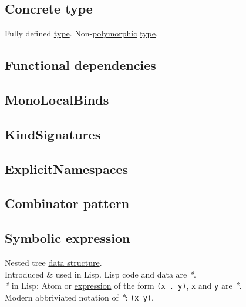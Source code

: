 \documentclass[11pt]{article}
\begin{document}
\subsection{\label{orgfa4f803}Concrete type}
\label{sec:org77739d4}
Fully defined \hyperref[orgc4aea2f]{type}. Non-\hyperref[orgac4d581]{polymorphic} \hyperref[orgc4aea2f]{type}.\\

\subsection{\label{orgf8fef8c}Functional dependencies}
\label{sec:orgbe6422d}

\subsection{\label{org6db8791}MonoLocalBinds}
\label{sec:orgb5f2fb9}

\subsection{\label{org06955ca}KindSignatures}
\label{sec:org8a5ca0e}

\subsection{\label{orgc940591}ExplicitNamespaces}
\label{sec:org87632a1}

\subsection{\label{org3b1b214}Combinator pattern}
\label{sec:orgd1977d7}

\subsection{\label{org72d9f8b}Symbolic expression}
\label{sec:org601420a}
Nested tree \hyperref[org51ce163]{data structure}.\\

Introduced \& used in Lisp. Lisp code and data are \emph{*}.\\

\emph{*} in Lisp: Atom or \hyperref[org9021dd7]{expression} of the form \texttt{(x . y)}, \texttt{x} and \texttt{y} are \emph{*}.\\

Modern abbriviated notation of \emph{*}: \texttt{(x y)}.\\
\end{document}
